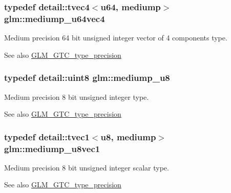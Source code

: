 \subsubsection[{\texorpdfstring{mediump\+\_\+u64vec4}{mediump_u64vec4}}]{\setlength{\rightskip}{0pt plus 5cm}typedef detail\+::tvec4$<$u64, mediump$>$ {\bf glm\+::mediump\+\_\+u64vec4}}\hypertarget{group__gtc__type__precision_gae25a6609fa377ba1ec983ec32a91f1d4}{}\label{group__gtc__type__precision_gae25a6609fa377ba1ec983ec32a91f1d4}
Medium precision 64 bit unsigned integer vector of 4 components type. \begin{DoxySeeAlso}{See also}
\hyperlink{group__gtc__type__precision}{G\+L\+M\+\_\+\+G\+T\+C\+\_\+type\+\_\+precision} 
\end{DoxySeeAlso}
\subsubsection[{\texorpdfstring{mediump\+\_\+u8}{mediump_u8}}]{\setlength{\rightskip}{0pt plus 5cm}typedef detail\+::uint8 {\bf glm\+::mediump\+\_\+u8}}\hypertarget{group__gtc__type__precision_gac04b372784392e82bd557f300c4de097}{}\label{group__gtc__type__precision_gac04b372784392e82bd557f300c4de097}
Medium precision 8 bit unsigned integer type. \begin{DoxySeeAlso}{See also}
\hyperlink{group__gtc__type__precision}{G\+L\+M\+\_\+\+G\+T\+C\+\_\+type\+\_\+precision} 
\end{DoxySeeAlso}
\subsubsection[{\texorpdfstring{mediump\+\_\+u8vec1}{mediump_u8vec1}}]{\setlength{\rightskip}{0pt plus 5cm}typedef detail\+::tvec1$<$u8, mediump$>$ {\bf glm\+::mediump\+\_\+u8vec1}}\hypertarget{group__gtc__type__precision_gadefca284b7a5980fb6be735abb77395e}{}\label{group__gtc__type__precision_gadefca284b7a5980fb6be735abb77395e}
Medium precision 8 bit unsigned integer scalar type. \begin{DoxySeeAlso}{See also}
\hyperlink{group__gtc__type__precision}{G\+L\+M\+\_\+\+G\+T\+C\+\_\+type\+\_\+precision} 
\end{DoxySeeAlso}
